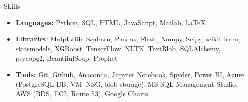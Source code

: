 \documentclass{resume} %
\begin{document}
	\begin{rSection}{Skills}
		\begin{itemize}[leftmargin=0em]
			\item {\bf Languages:}{ Python, SQL, HTML, JavaScript, Matlab, LaTeX}
			\item {\bf Libraries:}{ Matplotlib, Seaborn, Pandas, Flask, Numpy, Scipy, scikit-learn, statsmodels, XGBoost, TensorFlow, NLTK, TextBlob, SQLAlchemy, psycopg2, BeautifulSoup, Prophet }
			\item {\bf Tools:}{ Git, Github, Anaconda, Jupyter Notebook, Spyder, Power BI, Azure (PostgreSQL DB, VM, NSG, blob storage), MS SQL Management Studio, AWS (RDS, EC2, Route 53), Google Charts }
			
		\end{itemize}
	\end{rSection}
	
\end{document}
